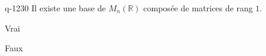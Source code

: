 \begin{truefalse}{q-1230}
Il existe une base de $M_n(\mathbb{R})$ composée de matrices de rang $1$.
\item* Vrai
\item Faux
\end{truefalse}

